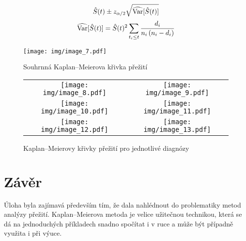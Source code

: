 \[ \hat{S}(t) \pm z_{\alpha / 2} \sqrt{\widehat{\operatorname{Var}}[\hat{S}(t)]} \]
\[ \widehat{\operatorname{Var}}[\hat{S}(t)] = \hat{S}(t)^{2} \sum_{t_{i} \leq t} \frac{d_{i}}{n_{i}\left(n_{i}-d_{i}\right)} \]

\begin{figure}[htbp]
    \texttt{[image: img/image\_7.pdf]}
    \centering
    \caption{Souhrnná Kaplan–Meierova křivka přežití}
\end{figure}
\FloatBarrier

\begin{figure}[htbp]
    \begin{tabular}{cc}

        \texttt{[image: img/image\_8.pdf]}   & \texttt{[image: img/image\_9.pdf]}     \\    
        \texttt{[image: img/image\_10.pdf]}  & \texttt{[image: img/image\_11.pdf]}    \\
        \texttt{[image: img/image\_12.pdf]}  & \texttt{[image: img/image\_13.pdf]}    \\
    
    \end{tabular}
    \centering
    \caption{Kaplan–Meierovy křivky přežití pro jednotlivé diagnózy}
\end{figure}
\FloatBarrier

\section{Závěr}

Úloha byla zajímavá především tím, že dala nahlédnout do problematiky metod analýzy přežití.
Kaplan–Meierova metoda je velice užitečnou technikou, která se dá na jednoduchých příkladech snadno spočítat i v ruce a může být případně využita i při výuce.
